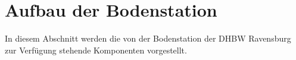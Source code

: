 
\clearpage
\section{Aufbau der Bodenstation}

In diesem Abschnitt werden die von der Bodenstation der DHBW Ravensburg zur Verfügung stehende Komponenten vorgestellt.
